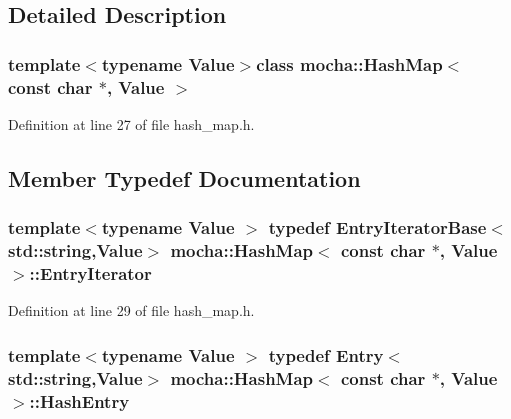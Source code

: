 \subsection{Detailed Description}
\subsubsection*{template$<$typename Value$>$class mocha::HashMap$<$ const char $\ast$, Value $>$}



Definition at line 27 of file hash\_\-map.h.



\subsection{Member Typedef Documentation}
\hypertarget{classmocha_1_1_hash_map_3_01const_01char_01_5_00_01_value_01_4_a6d4fd42742e1f425da11c48b752a071a}{
\subsubsection[{EntryIterator}]{\setlength{\rightskip}{0pt plus 5cm}template$<$typename Value $>$ typedef {\bf EntryIteratorBase}$<$std::string,Value$>$ {\bf mocha::HashMap}$<$ const char $\ast$, Value $>$::{\bf EntryIterator}}}
\label{classmocha_1_1_hash_map_3_01const_01char_01_5_00_01_value_01_4_a6d4fd42742e1f425da11c48b752a071a}


Definition at line 29 of file hash\_\-map.h.

\hypertarget{classmocha_1_1_hash_map_3_01const_01char_01_5_00_01_value_01_4_ae5c98db165f1b1bcfa42839abf6c3724}{
\subsubsection[{HashEntry}]{\setlength{\rightskip}{0pt plus 5cm}template$<$typename Value $>$ typedef {\bf Entry}$<$std::string,Value$>$ {\bf mocha::HashMap}$<$ const char $\ast$, Value $>$::{\bf HashEntry}}}
\label{classmocha_1_1_hash_map_3_01const_01char_01_5_00_01_value_01_4_ae5c98db165f1b1bcfa42839abf6c3724}


